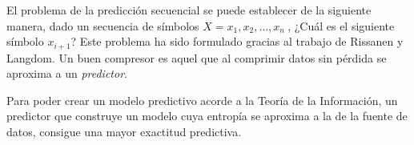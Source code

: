 El problema de la predicción secuencial se puede establecer de la siguiente manera, dado un secuencia de símbolos $ X = x_{1}, x_{2}, \dots, x_{n}\ $, ¿Cuál es el siguiente símbolo $x_{i+1}$? Este problema ha sido formulado gracias al trabajo de  Rissanen\cite{Rissanen1983} y Langdom\cite{Langdon1983}. Un buen compresor es aquel que al comprimir datos sin pérdida se aproxima a un \emph{predictor}.

 













Para poder crear un modelo predictivo acorde a la Teoría de la Información, un predictor que construye un modelo cuya entropía se aproxima a la de la fuente de datos, consigue una mayor exactitud predictiva. 


